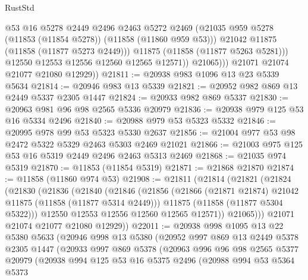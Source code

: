 \begin{lexlean}{RustStd}
\begin{coremodule}
                      @53
                      @16
                      @5278
                      @2449
                      @2496
                      @2463
                      @5272
                      @2469
                      (@21035 @959 @5278 (@11853 (@11854 @5278)) (@11858 (@11860 @959 @53)))
                      @21042
                      @11875
                      (@11858 (@11877 @5273 @2449)))
                    @11875
                    (@11858 (@11877 @5263 @5281)))
                  @12550
                  @12553
                  @12556
                  @12560
                  @12565
                  @12571))
              @21065)))
        @21071
        @21074
        @21077
        @21080
        @12929))
@21811 := @20938 @983 @1096 @13 @23 @5339 @5634
@21814 := @20946 @983 @13 @5339
@21821 := @20952 @982 @869 @13 @2449 @5337 @2305 @1447
@21824 := @20933 @982 @869 @5337
@21830 := @20963 @981 @96 @98 @2565 @5336 @20979
@21836 := @20938 @979 @125 @53 @16 @5334 @2496
@21840 := @20988 @979 @53 @5323 @5332
@21846 := @20995 @978 @99 @53 @5323 @5330 @2637
@21856 := @21004 @977 @53 @98 @2472 @5322 @5329 @2463 @5303 @2469 @21021
@21866 := @21003 @975 @125 @53 @16 @5319 @2449 @2496 @2463 @5313 @2469
@21868 := @21035 @974 @5319
@21870 := @11853 (@11854 @5319)
@21871 := @21868 @21870
@21874 := @11858 (@11860 @974 @53)
@21908 := @21811
    (@21814
      (@21821
        (@21824
          (@21830
            (@21836
              (@21840
                (@21846
                  (@21856
                    (@21866 (@21871 @21874) @21042 @11875 (@11858 (@11877 @5314 @2449)))
                    @11875
                    (@11858 (@11877 @5304 @5322)))
                  @12550
                  @12553
                  @12556
                  @12560
                  @12565
                  @12571))
              @21065)))
        @21071
        @21074
        @21077
        @21080
        @12929))
@22011 := @20938
    @998
    @1095
    @13
    @22
    @5380
    @5633
    (@20946
      @998
      @13
      @5380
      (@20952
        @997
        @869
        @13
        @2449
        @5378
        @2305
        @1447
        (@20933
          @997
          @869
          @5378
          (@20963
            @996
            @96
            @98
            @2565
            @5377
            @20979
            (@20938
              @994
              @125
              @53
              @16
              @5375
              @2496
              (@20988
                @994
                @53
                @5364
                @5373

\end{coremodule}
\end{lexlean}

